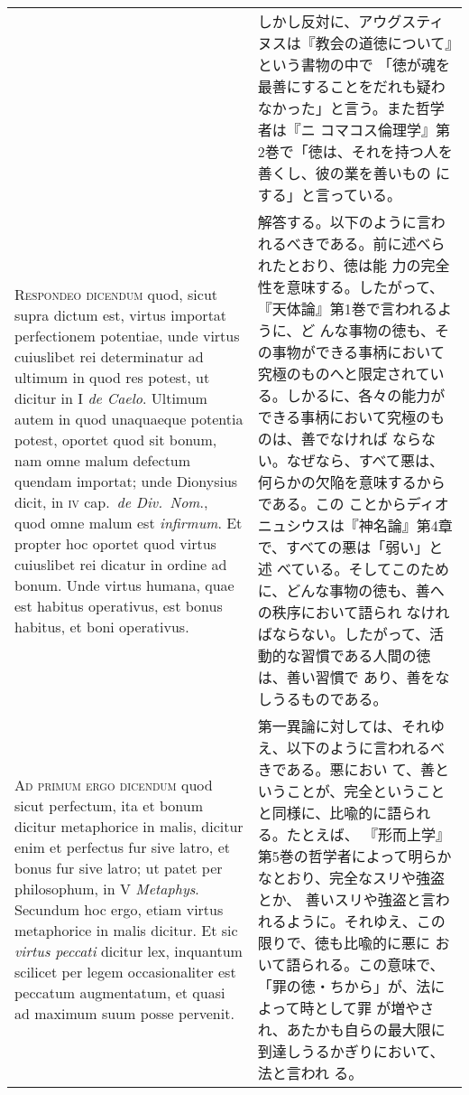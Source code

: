 \documentclass[10pt]{jsarticle}
\begin{document}
\begin{longtable}{p{21em}p{21em}}
&

しかし反対に、アウグスティヌスは『教会の道徳について』という書物の中で
「徳が魂を最善にすることをだれも疑わなかった」と言う。また哲学者は『ニ
コマコス倫理学』第2巻で「徳は、それを持つ人を善くし、彼の業を善いもの
にする」と言っている。

\\

{\scshape Respondeo dicendum} quod, sicut supra dictum est, virtus
importat perfectionem potentiae, unde virtus cuiuslibet rei
determinatur ad ultimum in quod res potest, ut dicitur in I {\itshape
de Caelo}. Ultimum autem in quod unaquaeque potentia potest, oportet
quod sit bonum, nam omne malum defectum quendam importat; unde
Dionysius dicit, in {\scshape iv} cap.~{\itshape de Div.~Nom}., quod
omne malum est {\itshape infirmum}. Et propter hoc oportet quod virtus
cuiuslibet rei dicatur in ordine ad bonum. Unde virtus humana, quae
est habitus operativus, est bonus habitus, et boni operativus.

&

解答する。以下のように言われるべきである。前に述べられたとおり、徳は能
力の完全性を意味する。したがって、『天体論』第1巻で言われるように、ど
んな事物の徳も、その事物ができる事柄において究極のものへと限定されてい
る。しかるに、各々の能力ができる事柄において究極のものは、善でなければ
ならない。なぜなら、すべて悪は、何らかの欠陥を意味するからである。この
ことからディオニュシウスは『神名論』第4章で、すべての悪は「弱い」と述
べている。そしてこのために、どんな事物の徳も、善への秩序において語られ
なければならない。したがって、活動的な習慣である人間の徳は、善い習慣で
あり、善をなしうるものである。

\\

{\scshape Ad primum ergo dicendum} quod sicut perfectum, ita et bonum
dicitur metaphorice in malis, dicitur enim et perfectus fur sive
latro, et bonus fur sive latro; ut patet per philosophum, in V
{\itshape Metaphys}. Secundum hoc ergo, etiam virtus metaphorice in
malis dicitur. Et sic {\itshape virtus peccati} dicitur lex, inquantum
scilicet per legem occasionaliter est peccatum augmentatum, et quasi
ad maximum suum posse pervenit.

&

第一異論に対しては、それゆえ、以下のように言われるべきである。悪におい
て、善ということが、完全ということと同様に、比喩的に語られる。たとえば、
『形而上学』第5巻の哲学者によって明らかなとおり、完全なスリや強盗とか、
善いスリや強盗と言われるように。それゆえ、この限りで、徳も比喩的に悪に
おいて語られる。この意味で、「罪の徳・ちから」が、法によって時として罪
が増やされ、あたかも自らの最大限に到達しうるかぎりにおいて、法と言われ
る。


\end{longtable}
\end{document}
